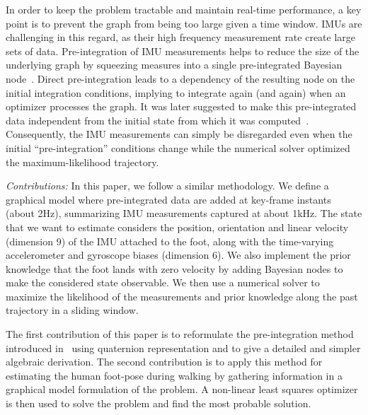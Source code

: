
In order to keep the problem tractable and maintain real-time performance, a key point is to prevent the graph from being too large given a time window.
IMUs are challenging in this regard, as their high frequency measurement rate create large sets of data. 
Pre-integration of IMU measurements helps to reduce the size of the underlying graph by squeezing measures into a single pre-integrated Bayesian node~\cite{LUPTON-09}.
Direct pre-integration leads to a dependency of the resulting node on the initial integration conditions, implying to integrate again (and again) when an optimizer processes the graph.
It was later suggested to make this pre-integrated data independent from the initial state from which it was computed~\cite{forster2015imu}.
Consequently, the IMU measurements can simply be disregarded even when the initial ``pre-integration'' conditions change while the numerical solver optimized the maximum-likelihood trajectory.

\textit{Contributions: }
In this paper, we follow a similar methodology. We define a graphical model where pre-integrated data are added at key-frame instants (about 2Hz), summarizing IMU measurements captured at about 1kHz.
The state that we want to estimate considers the position, orientation and linear velocity (dimension 9) of the IMU attached to the foot, along with the time-varying accelerometer and gyroscope biases (dimension 6).
We also implement the prior knowledge that the foot lands with zero velocity by adding Bayesian nodes to make the considered state observable. 
We then use a numerical solver to maximize the likelihood of the measurements and prior knowledge along the past trajectory in a sliding window. 

The first contribution of this paper is to reformulate the pre-integration method introduced in~\cite{forster2015imu} using quaternion representation
and to give a detailed and simpler algebraic derivation.
The second contribution is to apply this method for estimating the human foot-pose during walking by gathering information in a graphical model formulation of the problem.
A non-linear least squares optimizer is then used to solve the problem and find the most probable solution.

